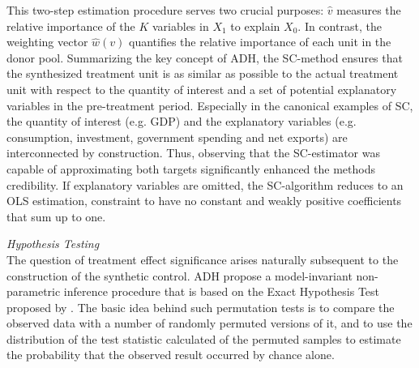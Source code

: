 This two-step estimation procedure serves two crucial purposes: $\widehat{v}$ measures the relative importance of the $K$ variables in $X_1$ to explain $X_0$. In contrast, the weighting vector $\widehat{w}(v)$ quantifies the relative importance of each unit in the donor pool. Summarizing the key concept of \ac{ADH}, the \ac{SC}-method ensures that the synthesized treatment unit is as similar as possible to the actual treatment unit with respect to the quantity of interest and a set of potential explanatory variables in the pre-treatment period. Especially in the canonical examples of \ac{SC}, the quantity of interest (e.g. \ac{GDP}) and the explanatory variables (e.g. consumption, investment, government spending and net exports) are interconnected by construction. Thus, observing that the \ac{SC}-estimator was capable of approximating both targets significantly enhanced the methods credibility. If explanatory variables are omitted, the \ac{SC}-algorithm reduces to an \ac{OLS} estimation, constraint to have no constant and weakly positive coefficients that sum up to one.

\textit{Hypothesis Testing} \\
The question of treatment effect significance arises naturally subsequent to the construction of the synthetic control. \ac{ADH} propose a model-invariant non-parametric inference procedure that is based on the Exact Hypothesis Test proposed by \cite{fisher:1971}. The basic idea behind such permutation tests is to compare the observed data with a number of randomly permuted versions of it, and to use the distribution of the test statistic calculated of the permuted samples to estimate the probability that the observed result occurred by chance alone. 

